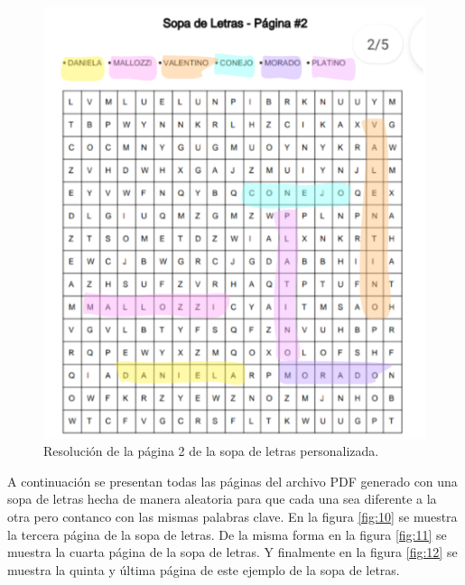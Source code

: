 \documentclass[conference]{IEEEtran}
\begin{document}
\begin{figure}[H]
    \centering
    \includegraphics[width=0.9\columnwidth]{imagenes/solucion2.png}
    \caption{Resolución de la página 2 de la sopa de letras personalizada.}
    \label{fig:9}
\end{figure}


A continuación se presentan todas las páginas del archivo PDF generado con una sopa de letras hecha de manera aleatoria para que cada una sea diferente a la otra pero contanco con las mismas palabras clave. 
En la figura \ref{fig:10} se muestra la tercera página de la sopa de letras. De la misma forma en la figura \ref{fig:11} se muestra la cuarta página de la sopa de letras. Y finalmente en la figura \ref{fig:12} se muestra la quinta y última página de este ejemplo de la sopa de letras.
\end{document}
